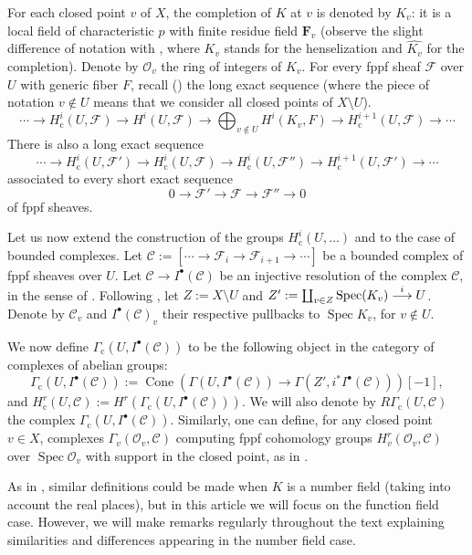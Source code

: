 \documentclass[11pt]{article}
\let\mathcal\mathscr
\newcommand\To[1]{\mathchoice{\xrightarrow{\textstyle\kern4pt#1\kern3pt}}{\stackrel{#1}{\longrightarrow}}{}{}}
\newcommand{\sbullet}{{\scriptscriptstyle\bullet}}
\newcommand{\rc}{\mathrm{c}}
\theoremstyle{plain}
\theoremstyle{definition}
\DeclareMathOperator\Cone{Cone}
\DeclareMathOperator \spec {Spec}
\newcommand \FF {\mathbf{F}}
\newcommand\cF {\mathcal{F}}
\newcommand\cO {\mathcal{O}}
\newcommand \cC {\mathcal{C}}
\begin{document}
For each closed point $v$ of $X$, the completion of $K$ at $v$
is denoted by $K_v$: it is a local field of characteristic $p$ with
finite residue field $\FF_v$ (observe the slight difference of notation with
\cite{DemH}, where $K_v$ stands for the henselization and $\widehat{K_v}$
for the completion). Denote by $\cO_v$ the ring of integers of $K_v$.
For every fppf sheaf $\cF$
over $U$ with generic fiber $F$, recall (\cite[Prop.\,2.1]{DemH})
the long exact sequence (where the piece of notation $v \not \in U$ means
that we consider all closed points of $X\setminus U$).
\begin{equation} \label{suppcomp}
\cdots\to H^i_\rc(U,\cF) \to H^i(U,\cF) \to \bigoplus_{v \not
\in U} H^i(K_v,F) \to H^{i+1}_\rc(U,\cF) \to\cdots
\end{equation}
There is also a long exact sequence
\begin{equation} \label{longex1}
\cdots\to H^i_\rc(U,\cF') \to H^i_\rc(U,\cF) \to
H^i_\rc(U,\cF'') \to H^{i+1}_\rc(U,\cF ') \to\cdots
\end{equation}
associated to every short exact sequence
\[
0 \to \cF' \to \cF \to \cF'' \to 0
\]
of fppf sheaves.

Let us now extend the construction of the groups $H^i_\rc(U,\dots)$ and \cite[Prop.\,2.1]{DemH} to the case of bounded complexes.
Let $\cC:= [\cdots\to \cF_i \to \cF_{i+1} \to\cdots]$ be a bounded complex of fppf sheaves over $U$.
Let $\cC \to I^\sbullet(\cC)$ be an injective resolution of the complex $\cC$, in the sense of \cite[Tag 013K]{SP}.
Following \cite[\S2]{DemH}, let $Z:= X \setminus U$ and
$Z':= \coprod_{v \in Z} \spec({K_v}) \To{i} U$.
Denote by $\cC_v$ and $I^\sbullet(\cC)_v$ their respective
pullbacks to $\spec K_v$, for $v \notin U$.

We now define $\Gamma_\rc(U, I^\sbullet(\cC))$ to be the following object in the category of complexes of abelian groups:
\[
\Gamma_\rc(U, I^\sbullet(\cC)):= \Cone\left(\Gamma(U, I^\sbullet(\cC)) \to \Gamma(Z', i^* I^\sbullet(\cC)) \right)[-1],
\]
and $H^r_\rc(U, \cC):= H^r(\Gamma_\rc(U, I^\sbullet(\cC)))$. We will also denote by $R\Gamma_\rc(U,\cC)$ the complex $\Gamma_\rc(U, I^\sbullet(\cC))$.
Similarly, one can define, for any closed point $v \in X$, complexes $\Gamma_v(\cO_v, \cC)$ computing fppf cohomology groups $H^r_v(\cO_v, \cC)$ over $\spec \cO_v$ with support in the closed point, as in \cite[before Lem.\,2.6]{DemH}.

As in \cite{DemH}, similar definitions could be made when $K$ is a number field (taking into account the real places), but in this article we will focus on the function field case. However, we will make remarks regularly throughout the text explaining similarities and differences appearing in the number field case.
\end{document}
